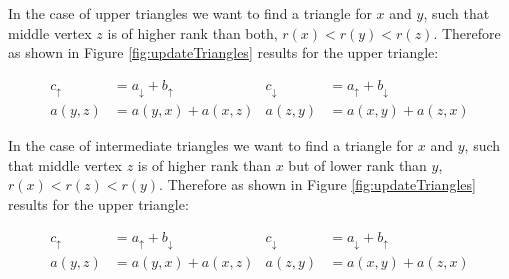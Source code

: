 In the case of upper triangles we want to find a triangle for $x$ and $y$, such that middle vertex $z$ is of higher rank than both,  $r(x) < r(y) < r(z)$.
Therefore as shown in Figure \ref{fig:updateTriangles} results for the upper triangle:

\begin{align*}\label{eq:upper_triangle}
    c_\uparrow & = a_\downarrow + b_\uparrow    &  c_\downarrow & = a_\uparrow + b_\downarrow \\
    a(y, z) & = a(y, x) + a(x, z) & a(z, y) & = a(x, y) + a(z, x)
\end{align*}

In the case of intermediate triangles we want to find a triangle for $x$ and $y$, such that middle vertex $z$ is of higher rank than $x$ but of lower rank than $y$,  $r(x) < r(z) < r(y)$.
Therefore as shown in Figure \ref{fig:updateTriangles} results for the upper triangle:

\begin{align*}
    c_\uparrow & = a_\uparrow + b_\downarrow    &  c_\downarrow & = a_\downarrow + b_\uparrow \\
    a(y, z) & = a(y, x) + a(x, z) & a(z, y) & = a(x, y) + a(z, x)
\end{align*}
